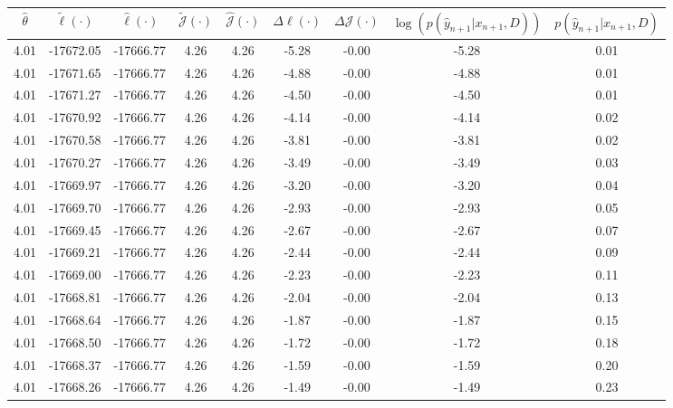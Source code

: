 \begin{table}[htbp]
        \centering
        \tiny
        \begin{adjustbox}{angle=90}
            \begin{tabular}{|c|c|c|c|c|c|c|c|c|}
                \hline
                 $\hat{\theta}$ & $\tilde{\ell}(\cdot)$ & $\hat{\ell}(\cdot)$ & $\tilde{\mathcal{J}}(\cdot)$ & $\hat{\mathcal{J}}(\cdot)$ & $\Delta \ell(\cdot)$ & $\Delta \mathcal{J}(\cdot)$ & $\log(p(\hat{y}_{n+1}|x_{n+1}, D))$ & $p(\hat{y}_{n+1}|x_{n+1}, D)$ \\
                \hline
                 4.01 & -17672.05 & -17666.77 & 4.26 & 4.26 & -5.28 & -0.00 & -5.28 & 0.01\\ \hline
 4.01 & -17671.65 & -17666.77 & 4.26 & 4.26 & -4.88 & -0.00 & -4.88 & 0.01\\ \hline
 4.01 & -17671.27 & -17666.77 & 4.26 & 4.26 & -4.50 & -0.00 & -4.50 & 0.01\\ \hline
 4.01 & -17670.92 & -17666.77 & 4.26 & 4.26 & -4.14 & -0.00 & -4.14 & 0.02\\ \hline
 4.01 & -17670.58 & -17666.77 & 4.26 & 4.26 & -3.81 & -0.00 & -3.81 & 0.02\\ \hline
 4.01 & -17670.27 & -17666.77 & 4.26 & 4.26 & -3.49 & -0.00 & -3.49 & 0.03\\ \hline
 4.01 & -17669.97 & -17666.77 & 4.26 & 4.26 & -3.20 & -0.00 & -3.20 & 0.04\\ \hline
 4.01 & -17669.70 & -17666.77 & 4.26 & 4.26 & -2.93 & -0.00 & -2.93 & 0.05\\ \hline
 4.01 & -17669.45 & -17666.77 & 4.26 & 4.26 & -2.67 & -0.00 & -2.67 & 0.07\\ \hline
 4.01 & -17669.21 & -17666.77 & 4.26 & 4.26 & -2.44 & -0.00 & -2.44 & 0.09\\ \hline
 4.01 & -17669.00 & -17666.77 & 4.26 & 4.26 & -2.23 & -0.00 & -2.23 & 0.11\\ \hline
 4.01 & -17668.81 & -17666.77 & 4.26 & 4.26 & -2.04 & -0.00 & -2.04 & 0.13\\ \hline
 4.01 & -17668.64 & -17666.77 & 4.26 & 4.26 & -1.87 & -0.00 & -1.87 & 0.15\\ \hline
 4.01 & -17668.50 & -17666.77 & 4.26 & 4.26 & -1.72 & -0.00 & -1.72 & 0.18\\ \hline
 4.01 & -17668.37 & -17666.77 & 4.26 & 4.26 & -1.59 & -0.00 & -1.59 & 0.20\\ \hline
 4.01 & -17668.26 & -17666.77 & 4.26 & 4.26 & -1.49 & -0.00 & -1.49 & 0.23\\ \hline

\end{tabular}
\end{adjustbox}
\end{table}
